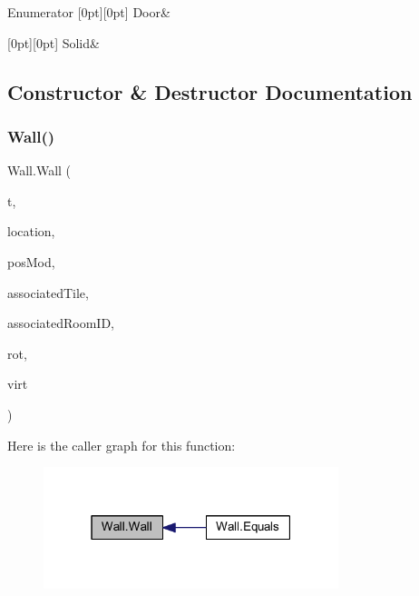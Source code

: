 \begin{DoxyEnumFields}{Enumerator}
[0pt][0pt]{}\mbox{\label{class_wall_a1366d94ac70428624a6703d7db89638daf44e14d49cd011d1e873d9fe0c4624f1}} 
Door&\\
\hline

[0pt][0pt]{}\mbox{\label{class_wall_a1366d94ac70428624a6703d7db89638dae41480b6bbfbf7407974a88d3d34f4fa}} 
Solid&\\
\hline

\end{DoxyEnumFields}


\subsection{Constructor \& Destructor Documentation}
\mbox{\label{class_wall_a4c5f79551eaa6006ef8d243c6cb4407f}} 
\subsubsection{\texorpdfstring{Wall()}{Wall()}}
{\footnotesize\ttfamily Wall.\+Wall (\begin{DoxyParamCaption}\item[{\mbox{\hyperlink{class_wall_a1366d94ac70428624a6703d7db89638d}{Wall\+Type}}}]{t,  }\item[{Vector2 \mbox{[}$\,$\mbox{]}}]{location,  }\item[{float}]{pos\+Mod,  }\item[{Vector2\+Int}]{associated\+Tile,  }\item[{uint}]{associated\+Room\+ID,  }\item[{\mbox{\hyperlink{class_wall_a0ff16a0e73bfc8f0d89c5fd6849e3a97}{Wall\+Rotation}}}]{rot,  }\item[{\mbox{\hyperlink{class_museum}{Museum}}}]{virt }\end{DoxyParamCaption})}

Here is the caller graph for this function\+:
\nopagebreak
\begin{figure}[H]
\begin{center}
\leavevmode
\includegraphics[width=244pt]{class_wall_a4c5f79551eaa6006ef8d243c6cb4407f_icgraph}
\end{center}
\end{figure}


